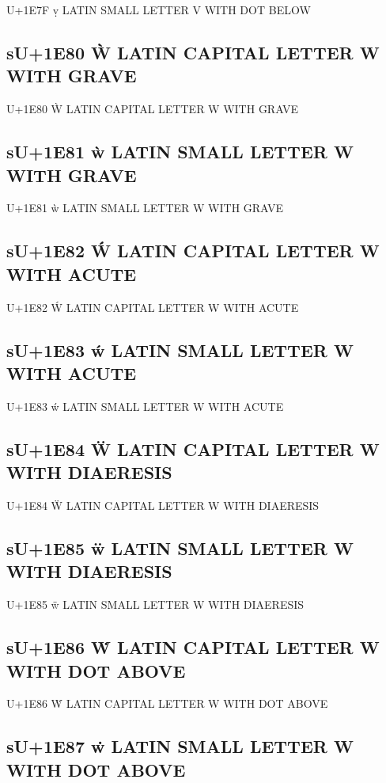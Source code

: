 U+1E7F ṿ LATIN SMALL LETTER V WITH DOT BELOW

\subsection{sU+1E80 Ẁ LATIN CAPITAL LETTER W WITH GRAVE}

U+1E80 Ẁ LATIN CAPITAL LETTER W WITH GRAVE

\subsection{sU+1E81 ẁ LATIN SMALL LETTER W WITH GRAVE}

U+1E81 ẁ LATIN SMALL LETTER W WITH GRAVE

\subsection{sU+1E82 Ẃ LATIN CAPITAL LETTER W WITH ACUTE}

U+1E82 Ẃ LATIN CAPITAL LETTER W WITH ACUTE

\subsection{sU+1E83 ẃ LATIN SMALL LETTER W WITH ACUTE}

U+1E83 ẃ LATIN SMALL LETTER W WITH ACUTE

\subsection{sU+1E84 Ẅ LATIN CAPITAL LETTER W WITH DIAERESIS}

U+1E84 Ẅ LATIN CAPITAL LETTER W WITH DIAERESIS

\subsection{sU+1E85 ẅ LATIN SMALL LETTER W WITH DIAERESIS}

U+1E85 ẅ LATIN SMALL LETTER W WITH DIAERESIS

\subsection{sU+1E86 Ẇ LATIN CAPITAL LETTER W WITH DOT ABOVE}

U+1E86 Ẇ LATIN CAPITAL LETTER W WITH DOT ABOVE

\subsection{sU+1E87 ẇ LATIN SMALL LETTER W WITH DOT ABOVE}


